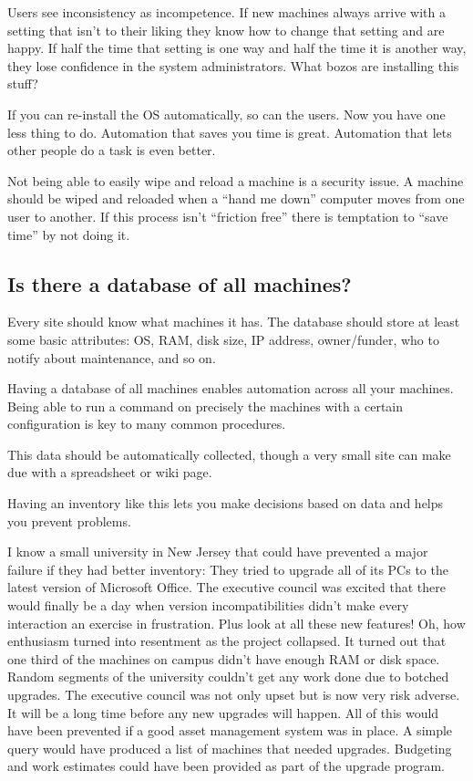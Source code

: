 \documentclass{article}
\begin{document}
Users see inconsistency as incompetence. If new machines always arrive with a setting that isn't to their liking they know how to change that setting and are happy. If half the time that setting is one way and half the time it is another way, they lose confidence in the system administrators. What bozos are installing this stuff?

If you can re-install the OS automatically, so can the users. Now you have one less thing to do. Automation that saves you time is great. Automation that lets other people do a task is even better.

Not being able to easily wipe and reload a machine is a security issue. A machine should be wiped and reloaded when a ``hand me down'' computer moves from one user to another. If this process isn't ``friction free'' there is temptation to ``save time'' by not doing it.

\subsection{Is there a database of all machines?}
Every site should know what machines it has. The database should store at least some basic attributes: OS, RAM, disk size, IP address, owner/funder, who to notify about maintenance, and so on.

Having a database of all machines enables automation across all your machines. Being able to run a command on precisely the machines with a certain configuration is key to many common procedures.

This data should be automatically collected, though a very small site can make due with a spreadsheet or wiki page.

Having an inventory like this lets you make decisions based on data and helps you prevent problems.

I know a small university in New Jersey that could have prevented a major failure if they had better inventory: They tried to upgrade all of its PCs to the latest version of Microsoft Office. The executive council was excited that there would finally be a day when version incompatibilities didn't make every interaction an exercise in frustration. Plus look at all these new features! Oh, how enthusiasm turned into resentment as the project collapsed. It turned out that one third of the machines on campus didn't have enough RAM or disk space. Random segments of the university couldn't get any work done due to botched upgrades. The executive council was not only upset but is now very risk adverse. It will be a long time before any new upgrades will happen. All of this would have been prevented if a good asset management system was in place. A simple query would have produced a list of machines that needed upgrades. Budgeting and work estimates could have been provided as part of the upgrade program.
\end{document}
